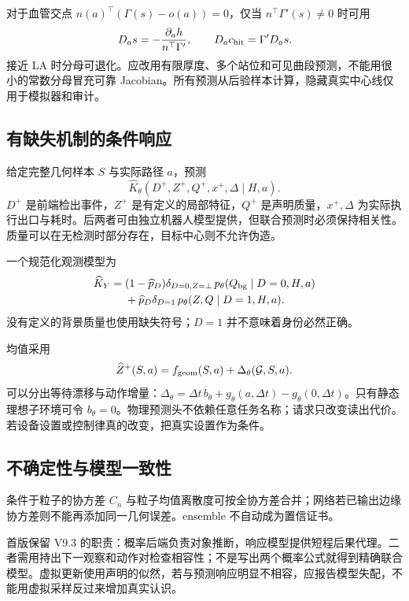 \documentclass[UTF8,fontset=fandol,11pt,a4paper]{ctexart}
\theoremstyle{plain}
\theoremstyle{definition}
\theoremstyle{remark}
\numberwithin{equation}{section}
\begin{document}
对于血管交点 $n(a)^\top(\Gamma(s)-o(a))=0$，仅当 $n^\top\Gamma'(s)\ne0$ 时可用
\begin{equation}
D_as=-\frac{\partial_ah}{n^\top\Gamma'},\qquad D_ac_{\rm hit}=\Gamma'D_as.
\end{equation}
接近 LA 时分母可退化。应改用有限厚度、多个站位和可见曲段预测，不能用很小的常数分母冒充可靠 Jacobian。所有预测从后验样本计算，隐藏真实中心线仅用于模拟器和审计。

\subsection{有缺失机制的条件响应}
给定完整几何样本 $S$ 与实际路径 $a$，预测
\begin{equation}
\widehat K_\theta(D^+,Z^+,Q^+,x^+,\Delta\mid H,a).
\end{equation}
$D^+$ 是前端检出事件，$Z^+$ 是有定义的局部特征，$Q^+$ 是声明质量，$x^+,\Delta$ 为实际执行出口与耗时。后两者可由独立机器人模型提供，但联合预测时必须保持相关性。质量可以在无检测时部分存在，目标中心则不允许伪造。

一个规范化观测模型为
\begin{equation}
\begin{split}
\widehat K_Y={}&(1-\widehat p_D)\delta_{D=0,Z=\bot}\,
 p_\theta(Q_{\rm bg}\mid D=0,H,a)\\
&+\widehat p_D\delta_{D=1}\,
 p_\theta(Z,Q\mid D=1,H,a).
\end{split}
\label{eq:missing}
\end{equation}
没有定义的背景质量也使用缺失符号；$D=1$ 并不意味着身份必然正确。

均值采用
\begin{equation}
\widehat Z^+(S,a)=f_{\rm geom}(S,a)+\Delta_\theta(\mathcal G,S,a).
\label{eq:response}
\end{equation}
可以分出等待漂移与动作增量：$\Delta_\theta=\Delta t\,b_\theta+g_\theta(a,\Delta t)-g_\theta(0,\Delta t)$。只有静态理想子环境可令 $b_\theta=0$。物理预测头不依赖任意任务名称；请求只改变读出代价。若设备设置或控制律真的改变，把真实设置作为条件。

\subsection{不确定性与模型一致性}
条件于粒子的协方差 $C_n$ 与粒子均值离散度可按全协方差合并；网络若已输出边缘协方差则不能再添加同一几何误差。ensemble 不自动成为置信证书。

首版保留 V9.3 的职责：概率后端负责对象推断，响应模型提供短程后果代理。二者需用持出下一观察和动作对检查相容性；不是写出两个概率公式就得到精确联合模型。虚拟更新使用声明的似然，若与预测响应明显不相容，应报告模型失配，不能用虚拟采样反过来增加真实认识。
\end{document}
